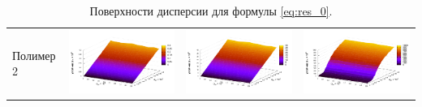 \documentclass[11pt,a4paper]{article}
\theoremstyle{definition}
\begin{document}
\begin{table}[h]
\begin{tabular}{l | c c c}
	\begin{rotate}{90}Полимер 2\end{rotate} &	\includegraphics[scale=0.4]{figs/even/p2.txt_coeff0.dat.pdf} & \includegraphics[scale=0.4]{figs/even/p2.txt_coeff1.dat.pdf} & \includegraphics[scale=0.4]{figs/even/p2.txt_coeff2.dat.pdf}
  \end{tabular}
  \caption{Поверхности дисперсии для формулы \eqref{eq:res_0}.}
  \label{tabl:res_even}
\end{table}
\end{document}
